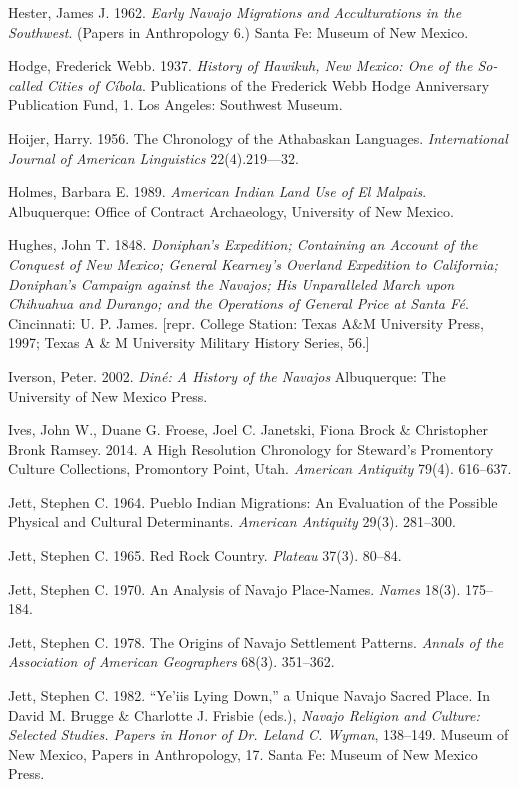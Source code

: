 \begin{hang}
	Hester, James J.  1962. \textit{Early Navajo Migrations and Acculturations in the Southwest}.  (Papers in Anthropology 6.)  Santa Fe:  Museum of New Mexico.

	Hodge, Frederick Webb. 1937.  \textit{History of Hawikuh, New Mexico: One of the So-called Cities of Cíbola}. Publications of the Frederick Webb Hodge Anniversary Publication Fund, 1.  Los Angeles:  Southwest Museum.

	Hoijer, Harry. 1956. The Chronology of the Athabaskan Languages. \textit{International Journal of American Linguistics} 22(4).219—32.

	Holmes, Barbara E. 1989. \textit{American Indian Land Use of El Malpais}. Albuquerque: Office of Contract Archaeology, University of New Mexico.

	Hughes, John T. 1848. \textit{Doniphan’s Expedition; Containing an Account of the Conquest of New Mexico; General Kearney’s Overland Expedition to California; Doniphan’s Campaign against the Navajos; His Unparalleled March upon Chihuahua and Durango; and the Operations of General Price at Santa Fé}.  Cincinnati:  U. P. James.  [repr. College Station:  Texas A\&M University Press, 1997; Texas A \& M University Military History Series, 56.]

	Iverson, Peter. 2002. \textit{Diné: A History of the Navajos}  Albuquerque:  The University of New Mexico Press.

	Ives, John W., Duane G. Froese, Joel C. Janetski, Fiona Brock \& Christopher Bronk Ramsey.  2014.  A High Resolution Chronology for Steward’s Promentory Culture Collections, Promontory Point, Utah.  \textit{American Antiquity} 79(4). 616--637.

	Jett, Stephen C.  1964.  Pueblo Indian Migrations: An Evaluation of the Possible Physical and Cultural Determinants.  \textit{American Antiquity} 29(3). 281--300.


	Jett, Stephen C.  1965.  Red Rock Country.  \textit{Plateau} 37(3). 80--84.

	Jett, Stephen C. 1970.  An Analysis of Navajo Place-Names.  \textit{Names} 18(3). 175--184.

	Jett, Stephen C.  1978.  The Origins of Navajo Settlement Patterns.  \textit{Annals of the Association of American Geographers} 68(3). 351--362.

	Jett, Stephen C.  1982.  “Ye’iis Lying Down,” a Unique Navajo Sacred Place.  In   David M. Brugge \& Charlotte J. Frisbie (eds.), \textit{Navajo Religion and Culture: Selected Studies. Papers in Honor of Dr. Leland C. Wyman}, 138--149.   Museum of New Mexico, Papers in Anthropology, 17.  Santa Fe:  Museum of New Mexico Press.


\end{hang}
